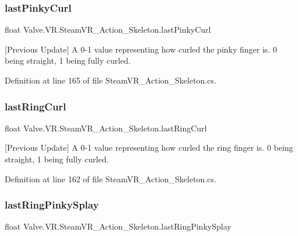 \subsubsection{\texorpdfstring{lastPinkyCurl}{lastPinkyCurl}}
{\footnotesize\ttfamily float Valve.\+V\+R.\+Steam\+V\+R\+\_\+\+Action\+\_\+\+Skeleton.\+last\+Pinky\+Curl\hspace{0.3cm}{\ttfamily [get]}}



\mbox{[}Previous Update\mbox{]} A 0-\/1 value representing how curled the pinky finger is. 0 being straight, 1 being fully curled. 



Definition at line 165 of file Steam\+V\+R\+\_\+\+Action\+\_\+\+Skeleton.\+cs.

\mbox{\label{class_valve_1_1_v_r_1_1_steam_v_r___action___skeleton_a7d76c5fdea67897391423e6897a7ae5c}} 
\subsubsection{\texorpdfstring{lastRingCurl}{lastRingCurl}}
{\footnotesize\ttfamily float Valve.\+V\+R.\+Steam\+V\+R\+\_\+\+Action\+\_\+\+Skeleton.\+last\+Ring\+Curl\hspace{0.3cm}{\ttfamily [get]}}



\mbox{[}Previous Update\mbox{]} A 0-\/1 value representing how curled the ring finger is. 0 being straight, 1 being fully curled. 



Definition at line 162 of file Steam\+V\+R\+\_\+\+Action\+\_\+\+Skeleton.\+cs.

\mbox{\label{class_valve_1_1_v_r_1_1_steam_v_r___action___skeleton_a511f573a2ff1fc6f6f96255a3716a8f0}} 
\subsubsection{\texorpdfstring{lastRingPinkySplay}{lastRingPinkySplay}}
{\footnotesize\ttfamily float Valve.\+V\+R.\+Steam\+V\+R\+\_\+\+Action\+\_\+\+Skeleton.\+last\+Ring\+Pinky\+Splay\hspace{0.3cm}{\ttfamily [get]}}




